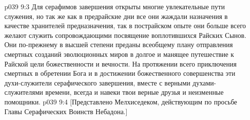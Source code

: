 \vs p039 9:3 Для серафимов завершения открыты многие увлекательные пути служения, но так же как в предрайские дни все они жаждали назначения в качестве хранителей предназначения, так в пострайском опыте они больше всего желают служить сопровождающими посвящение воплотившихся Райских Сынов. Они по\hyp{}прежнему в высшей степени преданы всеобщему плану отправления смертных созданий эволюционных миров в долгое и манящее путешествие к Райской цели божественности и вечности. На протяжении всего приключения смертных в обретении Бога и в достижении божественного совершенства эти духи\hyp{}служители серафического завершения, вместе с верными духами\hyp{}служителями времени, всегда и навеки твои верные друзья и неизменные помощники.
\vsetoff
\vs p039 9:4 [Представлено Мелхиседеком, действующим по просьбе Главы Серафических Воинств Небадона.]
\quizlink
